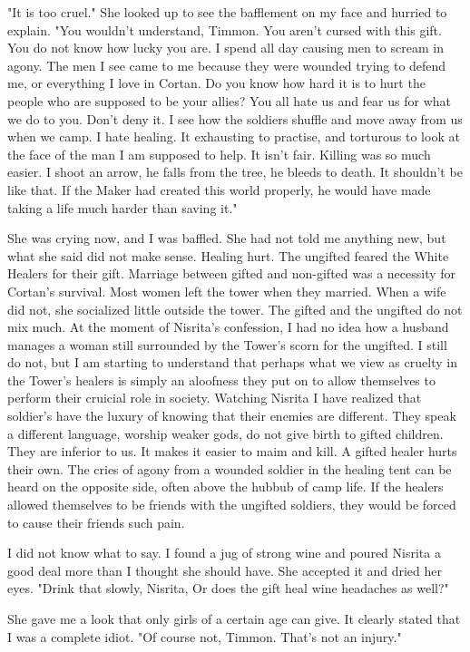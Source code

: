 \documentclass{article}
\begin{document}
"It is too cruel." She looked up to see the bafflement on my face and hurried to explain. "You wouldn't understand, Timmon. You aren't cursed with this gift. You do not know how lucky you are. I spend all day causing men to scream in agony. The men I see came to me because they were wounded trying to defend me, or everything I love in Cortan. Do you know how hard it is to hurt the people who are supposed to be your allies? You all hate us and fear us for what we do to you. Don't deny it. I see how the soldiers shuffle and move away from us when we camp. I hate healing.  It exhausting to practise, and torturous to look at the face of the man I am supposed to help. It isn't fair. Killing was so much easier. I shoot an arrow, he falls from the tree, he bleeds to death. It shouldn't be like that. If the Maker had created this world properly, he would have made taking a life much harder than saving it."

She was crying now, and I was baffled. She had not told me anything new, but what she said did not make sense. Healing hurt. The ungifted feared the White Healers for their gift. Marriage between gifted and non-gifted was a necessity for Cortan's survival. Most women left the tower when they married. When a wife did not, she socialized little outside the tower. The gifted and the ungifted do not mix much. At the moment of Nisrita's confession, I had no idea how a husband manages a woman still surrounded by the Tower's scorn for the ungifted. I still do not, but I am starting to understand that perhaps what we view as cruelty in the Tower's healers is simply an aloofness they put on to allow themselves to perform their cruicial role in society. Watching Nisrita I have realized that soldier's have the luxury of knowing that their enemies are different. They speak a different language, worship weaker gods, do not give birth to gifted children. They are inferior to us. It makes it easier to maim and kill. A gifted healer hurts their own. The cries of agony from a wounded soldier in the healing tent can be heard on the opposite side, often above the hubbub of camp life. If the healers allowed themselves to be friends with the ungifted soldiers, they would be forced to cause their friends such pain. 

I did not know what to say. I found a jug of strong wine and poured Nisrita a good deal more than I thought she should have. She accepted it and dried her eyes. "Drink that slowly, Nisrita, Or does the gift heal wine headaches as well?"

She gave me a look that only girls of a certain age can give. It clearly stated that I was a complete idiot. "Of course not, Timmon. That's not an injury."
\end{document}
